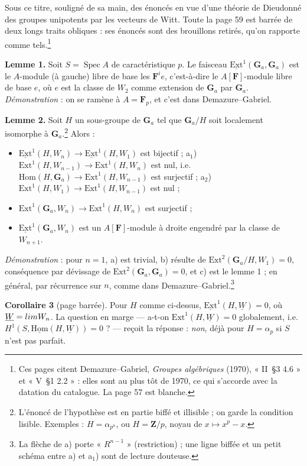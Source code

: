 \documentclass[11pt,a4paper]{article}
\begin{document}
Sous ce titre, souligné de sa main, des énoncés en vue d'une théorie de
Dieudonné des groupes unipotents par les vecteurs de Witt. Toute la page 59 est
barrée de deux longs traits obliques : ses énoncés sont des brouillons retirés,
qu'on rapporte comme tels.\footnote{Ces pages citent Demazure--Gabriel,
\emph{Groupes algébriques} (1970), « II~§3 4.6 » et « V~§1 2.2 » : elles sont au
plus tôt de 1970, ce qui s'accorde avec la datation du catalogue. La page 57
est blanche.}

\textbf{Lemme 1.} Soit $S = \operatorname{Spec}A$ de caractéristique $p$. Le
faisceau $\underline{\mathrm{Ext}}^1(\mathbf{G}_a, \mathbf{G}_a)$ est le
$A$-module (à gauche) libre de base les $\mathbf{F}^i e$, c'est-à-dire le
$A[\mathbf{F}]$-module libre de base $e$, où $e$ est la classe de $W_2$ comme
extension de $\mathbf{G}_a$ par $\mathbf{G}_a$. \emph{Démonstration} : on se
ramène à $A = \mathbf{F}_p$, et c'est dans Demazure--Gabriel.

\textbf{Lemme 2.} Soit $H$ un sous-groupe de $\mathbf{G}_a$ tel que
$\mathbf{G}_a/H$ soit localement isomorphe à $\mathbf{G}_a$.\footnote{L'énoncé
de l'hypothèse est en partie biffé et illisible ; on garde la condition lisible.
Exemples : $H = \alpha_{p^n}$, ou $H = \mathbf{Z}/p$, noyau de $x \mapsto x^p -
x$.} Alors :
\begin{itemize}
\item[a)] $\underline{\mathrm{Ext}}^1(H, W_n) \to \underline{\mathrm{Ext}}^1(H, W_1)$
est bijectif ; a$_1$) $\mathrm{Ext}^1(H, W_{n-1}) \to \mathrm{Ext}^1(H, W_n)$
est nul, i.e.\ $\mathrm{Hom}(H, \mathbf{G}_a) \to \mathrm{Ext}^1(H, W_{n-1})$ est
surjectif ; a$_2$) $\mathrm{Ext}^1(H, W_1) \to \mathrm{Ext}^1(H, W_{n-1})$ est
nul ;
\item[b)] $\mathrm{Ext}^1(\mathbf{G}_a, W_n) \to \mathrm{Ext}^1(H, W_n)$ est
surjectif ;
\item[c)] $\underline{\mathrm{Ext}}^1(\mathbf{G}_a, W_n)$ est un
$A[\mathbf{F}]$-module à droite engendré par la classe de $W_{n+1}$.
\end{itemize}
\emph{Démonstration} : pour $n = 1$, a) est trivial, b) résulte de
$\mathrm{Ext}^2(\mathbf{G}_a/H, W_1) = 0$, conséquence par dévissage de
$\mathrm{Ext}^2(\mathbf{G}_a, \mathbf{G}_a) = 0$, et c) est le lemme 1 ; en
général, par récurrence sur $n$, comme dans Demazure--Gabriel.\footnote{La
flèche de a) porte « $R^{n-1}$ » (restriction) ; une ligne biffée et un petit
schéma entre a) et a$_1$) sont de lecture douteuse.}

\textbf{Corollaire 3} (page barrée). Pour $H$ comme ci-dessus,
$\underline{\mathrm{Ext}}^1(H, \underline{W}) = 0$, où
$\underline{W} = \varinjlim W_n$. La question en marge — a-t-on
$\mathrm{Ext}^1(H, \underline{W}) = 0$ globalement, i.e.\
$H^1(S, \underline{\mathrm{Hom}}(H, \underline{W})) = 0$ ? — reçoit la réponse :
\emph{non}, déjà pour $H = \alpha_p$ si $S$ n'est pas parfait.
\end{document}
